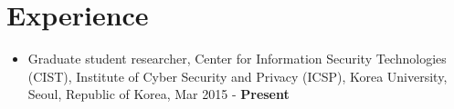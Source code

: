 \documentclass[a4paper,20pt]{article}
\begin{document}
\section{\textbf{Experience}}
\begin{itemize}
    \item {Graduate student researcher, Center for Information Security Technologies (CIST), Institute of Cyber Security and Privacy (ICSP), Korea University, Seoul, Republic of Korea, Mar 2015 - \textbf{Present}}
\end{itemize}
\end{document}
